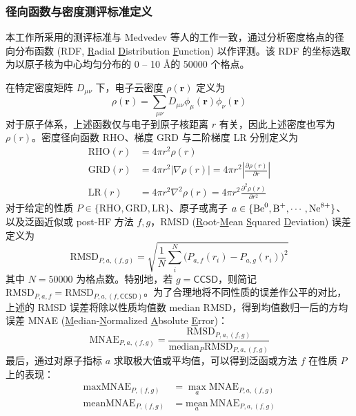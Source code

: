 \subsubsection{径向函数与密度测评标准定义}

本工作所采用的测评标准与 Medvedev 等人的工作\cite{Medvedev-Lyssenko.S.2017}一致，通过分析密度格点的径向分布函数 (RDF, \underline{R}adial \underline{D}istribution \underline{F}unction) 以作评测。该 RDF 的坐标选取为以原子核为中心均匀分布的 0 -- 10 \AA 的 50000 个格点。

在特定密度矩阵 $D_{\mu \nu}$ 下，电子云密度 $\rho(\bm{r})$ 定义为
\begin{equation}
    \rho(\bm{r}) = \sum_{\mu \nu} D_{\mu \nu} \phi_{\mu} (\bm{r}) \phi_{\nu} (\bm{r})
\end{equation}
对于原子体系，上述函数仅与电子到原子核距离 $r$ 有关，因此上述密度也写为 $\rho(r)$。密度径向函数 RHO、梯度 GRD 与二阶梯度 LR 分别定义为
\begin{align}
    \text{RHO}(r) &= 4 \pi r^2 \rho(r) \\
    \text{GRD}(r) &= 4 \pi r^2 | \nabla \rho(r) | = 4 \pi r^2 \left| \frac{\partial \rho(r)}{\partial r} \right| \\
    \text{LR}(r) &= 4 \pi r^2 \nabla^2 \rho(r) = 4 \pi r^2 \frac{\partial^2 \rho(r)}{\partial r^2}
\end{align}
对于给定的性质 $P \in \{\text{RHO}, \text{GRD}, \text{LR}\}$、原子或离子 $a \in \{\ce{Be^0}, \ce{B^+}, \cdots, \ce{Ne^8+}\}$、以及泛函近似或 post-HF 方法 $f, g$，RMSD (\underline{R}oot-\underline{M}ean \underline{S}quared \underline{D}eviation) 误差定义为
\begin{equation}
    \text{RMSD}_{P, a, (f, g)} = \sqrt{\frac{1}{N} \sum_i^N \big(P_{a, f} (r_i) - P_{a, g} (r_i) \big)^2}
\end{equation}
其中 $N = 50000$ 为格点数。特别地，若 $g = \textsf{CCSD}$，则简记 $\text{RMSD}_{P, a, f} = \text{RMSD}_{P, a, (f, \textsf{CCSD})}$。为了合理地将不同性质的误差作公平的对比，上述的 RMSD 误差将除以性质均值数 median RMSD，得到均值数归一后的方均误差 MNAE (\underline{M}edian-\underline{N}ormalized \underline{A}bsolute \underline{E}rror)：
\begin{equation}
    \text{MNAE}_{P, a, (f, g)} = \frac{\text{RMSD}_{P, a, (f, g)}}{\text{median}_{P} \text{RMSD}_{P, a, (f, g)}}
\end{equation}
最后，通过对原子指标 $a$ 求取极大值或平均值，可以得到泛函或方法 $f$ 在性质 $P$ 上的表现：
\begin{align}
    \text{maxMNAE}_{P, (f, g)} &= \max_a \text{MNAE}_{P, a, (f, g)} \\
    \text{meanMNAE}_{P, (f, g)} &= \underset{a}{\text{mean}} \, \text{MNAE}_{P, a, (f, g)}
\end{align}

